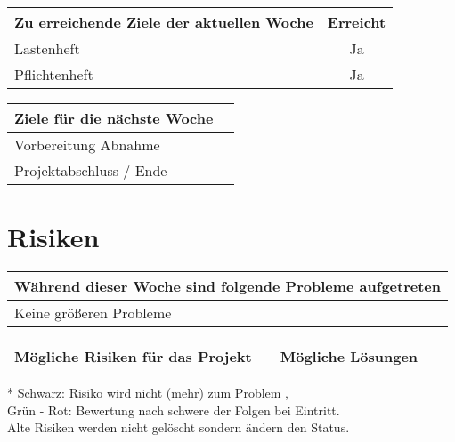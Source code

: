 \begin{tabularx}{\textwidth}{Xc}
\arrayrulecolor{OliveGreen}
\toprule
{\bfseries Zu erreichende Ziele der aktuellen Woche} 							& {\bfseries Erreicht}  	\\ 
\midrule[2pt]
Lastenheft									&Ja		\\
\rowcolor{OliveGreen!15}
Pflichtenheft								&Ja		\\
\bottomrule[2pt]
\end{tabularx}
%
\vspace{1cm}
%
\begin{tabularx}{\textwidth}{Xc}
\arrayrulecolor{OliveGreen}
\toprule
{\bfseries Ziele für die nächste Woche} &		\\ 
\midrule[2pt]
Vorbereitung Abnahme			  &		\\
\rowcolor{OliveGreen!15}
Projektabschluss / Ende			  &		\\

\end{tabularx}

\section*{Risiken}

\begin{tabularx}{\textwidth}{X}
\arrayrulecolor{OliveGreen}
\toprule
{\bfseries Während dieser Woche sind folgende Probleme aufgetreten} 	\\ 
\midrule[2pt]
Keine größeren Probleme											\\
\bottomrule[2pt]
\end{tabularx}

\vspace{1cm}

\begin{threeparttable}
\begin{tabularx}{\textwidth}{XcX}
\arrayrulecolor{OliveGreen}
\toprule
{\bfseries Mögliche Risiken für das Projekt}		& {\bfseries *} 					& {\bfseries Mögliche Lösungen} 	\\ \midrule[2pt]
\bottomrule[2pt]
\end{tabularx}

\begin{tablenotes}\footnotesize
\item[*] Schwarz: Risiko wird nicht (mehr) zum Problem	, 	\\
		Grün - Rot: Bewertung nach schwere der Folgen bei Eintritt.\\
		Alte Risiken werden nicht gelöscht sondern ändern den Status.
\end{tablenotes}
\end{threeparttable}

